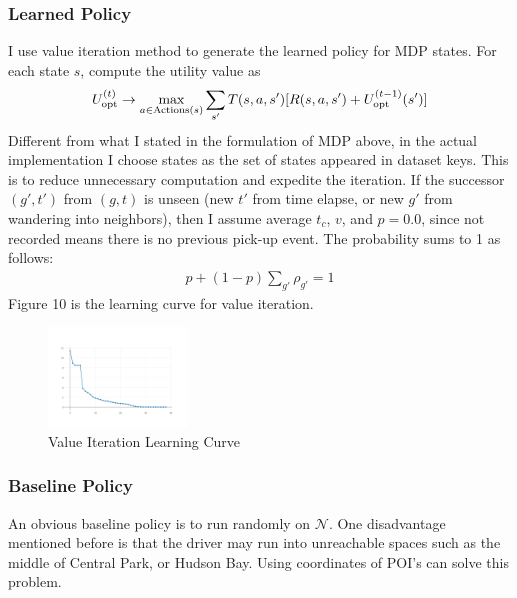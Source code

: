 \documentclass[letterpaper, 10 pt, conference]{ieeeconf}
\begin{document}
\subsubsection{Learned Policy}
I use value iteration method to generate the learned policy for MDP states. For each state $s$, compute the utility value as 
\begin{align}
U_{\text{opt}}^{(t)}\to \operatornamewithlimits{max}_{a\in \text{Actions}(s)}\sum_{s'}T(s,a,s')[R(s,a,s')+U_{\text{opt}}^{(t-1)}(s')]
\end{align}
Different from what I stated in the formulation of MDP above, in the actual implementation I choose states as the set of states appeared in dataset keys. This is to reduce unnecessary computation and expedite the iteration. If the successor $(g',t')$ from $(g,t)$ is unseen (new $t'$ from time elapse, or new $g'$ from wandering into neighbors), then I assume average $t_c$, $v$, and $p=0.0$, since not recorded means there is no previous pick-up event. The probability sums to 1 as follows:
\begin{align}
p + (1-p)\sum_{g'}\rho_{g'} =1
\end{align}
Figure 10 is the learning curve for value iteration.
\begin{figure}
\centering
\includegraphics[width=0.33\textwidth]{LearningCurve.png}
\caption{Value Iteration Learning Curve}
\end{figure}
\subsubsection{Baseline Policy}
An obvious baseline policy is to run randomly on $\mathcal{N}$. One disadvantage mentioned before is that the driver may run into unreachable spaces such as the middle of Central Park, or Hudson Bay. Using coordinates of POI's can solve this problem.
\end{document}
